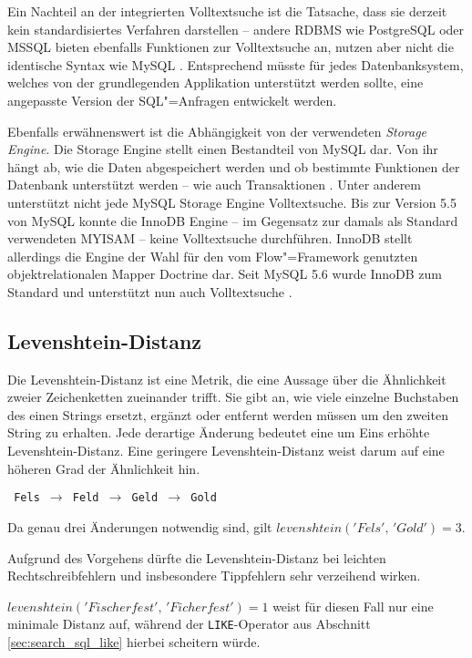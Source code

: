 Ein Nachteil an der integrierten Volltextsuche ist die Tatsache, dass sie derzeit kein standardisiertes Verfahren darstellen -- andere RDBMS wie PostgreSQL oder MSSQL bieten ebenfalls Funktionen zur Volltextsuche an, nutzen aber nicht die identische Syntax wie MySQL \cite[S. 39-41]{Redmond.2012} \cite{Microsoft.2015b}. Entsprechend müsste für jedes Datenbanksystem, welches von der grundlegenden Applikation unterstützt werden sollte, eine angepasste Version der SQL"=Anfragen entwickelt werden.

Ebenfalls erwähnenswert ist die Abhängigkeit von der verwendeten \emph{Storage Engine}. Die Storage Engine stellt einen Bestandteil von MySQL dar. Von ihr hängt ab, wie die Daten abgespeichert werden und ob bestimmte Funktionen der Datenbank unterstützt werden -- wie auch Transaktionen \cite{OracleCorporationandoritsaffiliates.2015b}. Unter anderem unterstützt nicht jede MySQL Storage Engine Volltextsuche. Bis zur Version 5.5 von MySQL konnte die InnoDB Engine -- im Gegensatz zur damals als Standard verwendeten MYISAM -- keine Volltextsuche durchführen. InnoDB stellt allerdings die Engine der Wahl für den vom Flow"=Framework genutzten objektrelationalen Mapper Doctrine dar. Seit MySQL 5.6 wurde InnoDB zum Standard und unterstützt nun auch Volltextsuche \cite[S.191]{Nixon.2014}.


\subsection{Levenshtein-Distanz}

Die Levenshtein-Distanz ist eine Metrik, die eine Aussage über die Ähnlichkeit zweier Zeichenketten zueinander trifft. Sie gibt an, wie viele einzelne Buchstaben des einen Strings ersetzt, ergänzt oder entfernt werden müssen um den zweiten String zu erhalten. Jede derartige Änderung bedeutet eine um Eins erhöhte Levenshtein-Distanz. Eine geringere Levenshtein-Distanz weist darum auf eine höheren Grad der Ähnlichkeit hin.

\texttt{
	Fels $\rightarrow$ Feld $\rightarrow$ Geld $\rightarrow$ Gold
}

Da genau drei Änderungen notwendig sind, gilt $levenshtein('Fels',\,'Gold') = 3$.

Aufgrund des Vorgehens dürfte die Levenshtein-Distanz bei leichten Rechtschreibfehlern und insbesondere Tippfehlern sehr verzeihend wirken.

$levenshtein('Fischerfest',\,'Ficherfest') = 1$ weist für diesen Fall nur eine minimale Distanz auf, während der \texttt{LIKE}-Operator aus Abschnitt \ref{sec:search_sql_like} hierbei scheitern würde.

